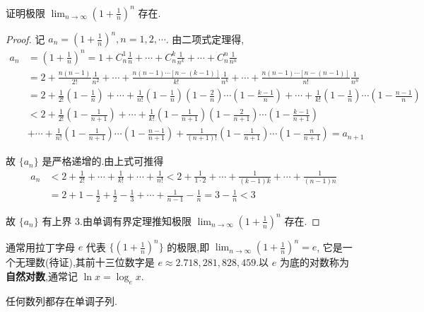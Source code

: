 \begin{example}
    证明极限 $\lim_{n\to\infty} (1+\frac{1}{n})^n$ 存在.
\end{example}

\begin{proof}
    记 $a_n=(1+\frac{1}{n})^n,n=1,2,\cdots$. 由二项式定理得,
    \begin{align*}
        a_n&=(1+\frac{1}{n})^n=1+C_n^1\frac{1}{n}+\cdots+C_n^k\frac{1}{n^k}+\cdots+C_n^n\frac{1}{n^n} \\
        & = 2+\frac{n(n-1)}{2!}\frac{1}{n^2}+\cdots+\frac{n(n-1)\cdots[n-(k-1)]}{k!}\frac{1}{n^k}+\cdots +\frac{n(n-1)\cdots [n-(n-1)]}{n!}\frac{1}{n^n} \\
        & = 2+\frac{1}{2!}(1-\frac{1}{n})+\cdots+\frac{1}{n!}(1-\frac{1}{n})(1-\frac{2}{n})\cdots(1-\frac{k-1}{n})+\cdots+\frac{1}{k!}(1-\frac{1}{n})\cdots(1-\frac{n-1}{n}) \\
        & < 2+\frac{1}{2!}(1-\frac{1}{n+1})+\cdots+\frac{1}{k!}(1-\frac{1}{n+1})(1-\frac{2}{n+1})\cdots(1-\frac{k-1}{n+1})\\
        & +\cdots+\frac{1}{n!}(1-\frac{1}{n+1})\cdots(1-\frac{n-1}{n+1})+\frac{1}{(n+1)!}(1-\frac{1}{n+1})\cdots(1-\frac{n}{n+1}) = a_{n+1}
    \end{align*}

    故 $\{a_n\}$ 是严格递增的.由上式可推得 
    \begin{align*}
        a_n&<2+\frac{1}{2!}+\cdots+\frac{1}{k!}+\cdots+\frac{1}{n!}<2+\frac{1}{1\cdot 2}+\cdots+\frac{1}{(k-1)k}+\cdots+\frac{1}{(n-1)n}  \\ 
        &=2+1-\frac{1}{2}+\frac{1}{2}-\frac{1}{3}+\cdots+\frac{1}{n-1}-\frac{1}{n}=3-\frac{1}{n}<3
    \end{align*}

    故 $\{a_n\}$ 有上界 3.由单调有界定理推知极限 $\lim_{n\to\infty} (1+\frac{1}{n})^n$ 存在.
\end{proof}

通常用拉丁字母 $e$ 代表 $\{(1+\frac{1}{n})^n\}$ 的极限,即 $\lim_{n\to\infty} (1+\frac{1}{n})^n=e$, 它是一个无理数(待证),其前十三位数字是 $e\approx 2.718,281,828,459$.以 $e$ 为底的对数称为 \textbf{自然对数},通常记 $\ln x=\log_e x$.

\begin{example}\label{ex:jiediao}
    任何数列都存在单调子列.
\end{example}

